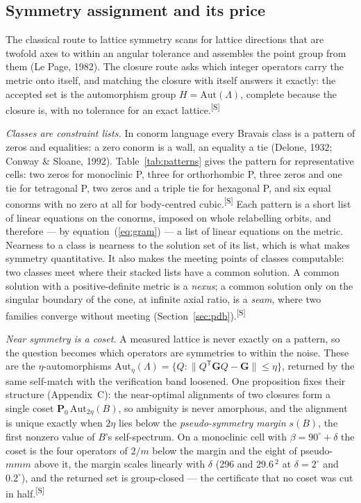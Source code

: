 \documentclass[preprint,pdf]{iucr}          %
\makeatletter
\newcommand{\Ang}{\text{\AA}}
\newcommand{\Gmet}{\mathbf{G}}
\newcommand{\Pop}{\mathbf{P}}
\newcommand{\chk}[1]{\textsuperscript{[S\@nameuse{zn@#1}]}}
\makeatother
\begin{document}
\subsection{Symmetry assignment and its price}
\label{sec:symmetry}
\label{sec:pseudo}

The classical route to lattice symmetry scans for lattice directions that are twofold axes to within an angular tolerance and assembles the point group from them (Le Page, 1982). The closure route asks which integer operators carry the metric onto itself, and matching the closure with itself answers it exactly: the accepted set is the automorphism group $H=\mathrm{Aut}(\Lambda)$, complete because the closure is, with no tolerance for an exact lattice.\chk{z:coset}

\emph{Classes are constraint lists.} In conorm language every Bravais class is a pattern of zeros and equalities: a zero conorm is a wall, an equality a tie (Delone, 1932; Conway \& Sloane, 1992). Table~\ref{tab:patterns} gives the pattern for representative cells: two zeros for monoclinic P, three for orthorhombic P, three zeros and one tie for tetragonal P, two zeros and a triple tie for hexagonal P, and six equal conorms with no zero at all for body-centred cubic.\chk{z:sym-profile} Each pattern is a short list of linear equations on the conorms, imposed on whole relabelling orbits, and therefore --- by equation~(\ref{eq:gram}) --- a list of linear equations on the metric. Nearness to a class is nearness to the solution set of its list, which is what makes symmetry quantitative. It also makes the meeting points of classes computable: two classes meet where their stacked lists have a common solution. A common solution with a positive-definite metric is a \emph{nexus}; a common solution only on the singular boundary of the cone, at infinite axial ratio, is a \emph{seam}, where two families converge without meeting (Section~\ref{sec:pdb}).\chk{z:nexus}

\emph{Near symmetry is a coset.} A measured lattice is never exactly on a pattern, so the question becomes which operators are symmetries to within the noise. These are the $\eta$-automorphisms $\mathrm{Aut}_\eta(\Lambda)=\{Q:\|Q^{\mathsf T}\Gmet Q-\Gmet\|\le\eta\}$, returned by the same self-match with the verification band loosened. One proposition fixes their structure (Appendix~C): the near-optimal alignments of two closures form a single coset $\Pop_0\,\mathrm{Aut}_{2\eta}(B)$, so ambiguity is never amorphous, and the alignment is unique exactly when $2\eta$ lies below the \emph{pseudo-symmetry margin} $s(B)$, the first nonzero value of $B$'s self-spectrum. On a monoclinic cell with $\beta=90^\circ+\delta$ the coset is the four operators of $2/m$ below the margin and the eight of pseudo-$mmm$ above it, the margin scales linearly with $\delta$ (296 and $29.6$\,\Ang$^2$ at $\delta=2^\circ$ and $0.2^\circ$), and the returned set is group-closed --- the certificate that no coset was cut in half.\chk{z:align-coset}
\end{document}
